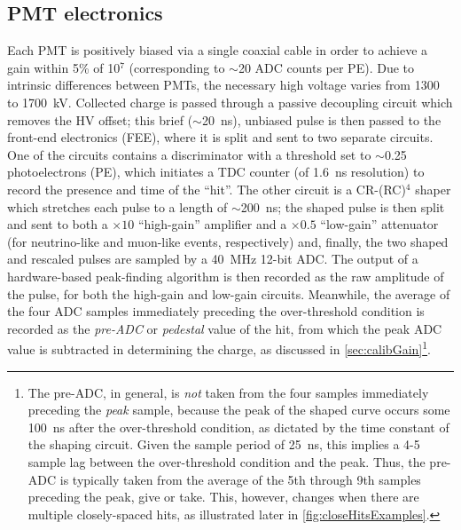 \documentclass[../thesis.tex]{subfiles}
\begin{document}
\subsection{PMT electronics}
\label{sec:expPmtElec}

Each PMT is positively biased via a single coaxial cable in order to achieve a gain within 5\% of 10$^7$ (corresponding to $\sim$20 ADC counts per PE). Due to intrinsic differences between PMTs, the necessary high voltage varies from 1300 to 1700~kV. Collected charge is passed through a passive decoupling circuit which removes the HV offset; this brief ($\sim$20~ns), unbiased pulse is then passed to the front-end electronics (FEE), where it is split and sent to two separate circuits. One of the circuits contains a discriminator with a threshold set to $\sim$0.25 photoelectrons (PE), which initiates a TDC counter (of 1.6~ns resolution) to record the presence and time of the ``hit''. The other circuit is a CR-(RC)$^4$ shaper which stretches each pulse to a length of $\sim$200~ns; the shaped pulse is then split and sent to both a $\times10$ ``high-gain'' amplifier and a $\times0.5$ ``low-gain'' attenuator (for neutrino-like and muon-like events, respectively) and, finally, the two shaped and rescaled pulses are sampled by a 40~MHz 12-bit ADC. The output of a hardware-based peak-finding algorithm is then recorded as the raw amplitude of the pulse, for both the high-gain and low-gain circuits. Meanwhile, the average of the four ADC samples immediately preceding the over-threshold condition is recorded as the \emph{pre-ADC} or \emph{pedestal} value of the hit, from which the peak ADC value is subtracted in determining the charge, as discussed in \autoref{sec:calibGain}\footnote{The pre-ADC, in general, is \emph{not} taken from the four samples immediately preceding the \emph{peak} sample, because the peak of the shaped curve occurs some 100~ns after the over-threshold condition, as dictated by the time constant of the shaping circuit. Given the sample period of 25~ns, this implies a 4-5 sample lag between the over-threshold condition and the peak. Thus, the pre-ADC is typically taken from the average of the 5th through 9th samples preceding the peak, give or take. This, however, changes when there are multiple closely-spaced hits, as illustrated later in \autoref{fig:closeHitsExamples}.}.
\end{document}
